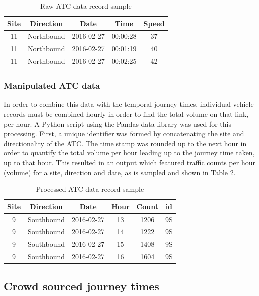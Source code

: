 \documentclass{CUP-JNL-DCE}
\begin{document}
\begin{table}[h!]
	\centering
	\caption{Raw ATC data record sample}
	\label{tab:table3.6}
	\begin{tabular}{ccccc}
		\toprule
		Site & Direction & Date & Time & Speed\\
		\midrule
		11 & Northbound & 2016-02-27 & 00:00:28 & 37\\
		11 & Northbound & 2016-02-27 & 00:01:19 & 40\\
		11 & Northbound & 2016-02-27 & 00:02:25 & 42\\
		\bottomrule
	\end{tabular}
\end{table}

\subsubsection{Manipulated ATC data}

In order to combine this data with the temporal journey times, individual vehicle records must be combined hourly in order to find the total volume on that link, per hour. A Python \citep{python_language} script using the Pandas \citep{python_pandas} data library was used for this processing. First, a unique identifier was formed by concatenating the site and directionality of the ATC. The time stamp was rounded up to the next hour in order to quantify the total volume per hour leading up to the journey time taken, up to that hour. This resulted in an output which featured traffic counts per hour (volume) for a site, direction and date, as is sampled and shown in Table \ref{tab:table3.7}.

\begin{table}[h!]
	\centering
	\caption{Processed ATC data record sample}
	\label{tab:table3.7}
	\begin{tabular}{cccccc}
		\toprule
		Site & Direction & Date & Hour & Count & id\\
		\midrule
		9 & Southbound & 2016-02-27 & 13 & 1206 & 9S\\
		9 & Southbound & 2016-02-27 & 14 & 1222& 9S\\
		9 & Southbound & 2016-02-27 & 15 & 1408& 9S\\
		9 & Southbound & 2016-02-27 & 16 & 1604& 9S\\
		\bottomrule
	\end{tabular}
\end{table}

\subsection{Crowd sourced journey times}
\end{document}
